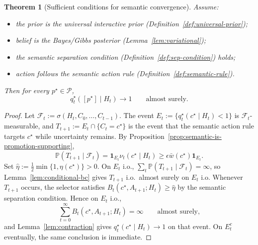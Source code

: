 \documentclass[11pt]{article}
\newtheorem{theorem}{Theorem}[section]
\theoremstyle{definition}
\theoremstyle{remark}
\newcommand{\Pcal}{\mathcal{P}}
\newcommand{\Prob}{\mathbb{P}}
\newcommand{\one}{\mathbf{1}}
\begin{document}
\begin{theorem}[Sufficient conditions for semantic convergence]
\label{thm:semantic-convergence}
Assume:
\begin{itemize}
\item[(C1)] the prior is the universal interactive prior (Definition~\ref{def:universal-prior});
\item[(C2)] belief is the Bayes/Gibbs posterior (Lemma~\ref{lem:variational});
\item[(C3)] the semantic separation condition (Definition~\ref{def:sep-condition}) holds;
\item[(C4)] action follows the semantic action rule (Definition~\ref{def:semantic-rule}).
\end{itemize}
Then for every $p^\star\in\Pcal$,
\[
q_t^\star([p^\star]\mid H_t)\longrightarrow 1
\qquad
\text{almost surely.}
\]
\end{theorem}

\begin{proof}
Let $\mathcal{F}_t:=\sigma(H_t,C_0,\dots,C_{t-1})$. The event $E_t:=\{q_t^\star(c^\star\mid H_t)<1\}$ is $\mathcal{F}_t$-measurable, and $T_{t+1}:=E_t\cap\{C_t=c^\star\}$ is the event that the semantic action rule targets $c^\star$ while uncertainty remains. By Proposition~\ref{prop:semantic-is-promotion-supporting},
\[
\Prob(T_{t+1}\mid\mathcal{F}_t)
=\one_{E_t}\nu_t(c^\star\mid H_t)\ge\epsilon\bar w(c^\star)\one_{E_t}.
\]
Set $\hat\eta:=\tfrac{1}{2}\min\{1,\eta(c^\star)\}>0$. On $E_t$ i.o., $\sum_t\Prob(T_{t+1}\mid\mathcal{F}_t)=\infty$, so Lemma~\ref{lem:conditional-bc} gives $T_{t+1}$ i.o.\ almost surely on $E_t$ i.o. Whenever $T_{t+1}$ occurs, the selector satisfies $B_t(c^\star,A_{t+1};H_t)\ge\hat\eta$ by the semantic separation condition. Hence on $E_t$ i.o.,
\[
\sum_{t=0}^{\infty}B_t(c^\star,A_{t+1};H_t)=\infty
\qquad
\text{almost surely,}
\]
and Lemma~\ref{lem:contraction} gives $q_t^\star(c^\star\mid H_t)\to 1$ on that event. On $E_t^c$ eventually, the same conclusion is immediate.
\end{proof}
\end{document}
